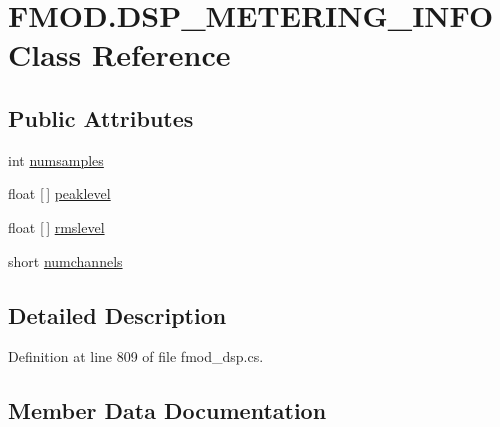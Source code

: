 \hypertarget{class_f_m_o_d_1_1_d_s_p___m_e_t_e_r_i_n_g___i_n_f_o}{}\section{F\+M\+O\+D.\+D\+S\+P\+\_\+\+M\+E\+T\+E\+R\+I\+N\+G\+\_\+\+I\+N\+FO Class Reference}
\label{class_f_m_o_d_1_1_d_s_p___m_e_t_e_r_i_n_g___i_n_f_o}
\subsection*{Public Attributes}
\begin{DoxyCompactItemize}
\item 
int \hyperlink{class_f_m_o_d_1_1_d_s_p___m_e_t_e_r_i_n_g___i_n_f_o_a053ebd13b97ccd7d6b63060e88d7ae6f}{numsamples}
\item 
float \mbox{[}$\,$\mbox{]} \hyperlink{class_f_m_o_d_1_1_d_s_p___m_e_t_e_r_i_n_g___i_n_f_o_ac0153e5a96990406af1755f95d36963e}{peaklevel}
\item 
float \mbox{[}$\,$\mbox{]} \hyperlink{class_f_m_o_d_1_1_d_s_p___m_e_t_e_r_i_n_g___i_n_f_o_a43763cecddf4c882368f5d0ec709fd3b}{rmslevel}
\item 
short \hyperlink{class_f_m_o_d_1_1_d_s_p___m_e_t_e_r_i_n_g___i_n_f_o_a6ff33cbf09acf8870fdaee94e5d45282}{numchannels}
\end{DoxyCompactItemize}


\subsection{Detailed Description}


Definition at line 809 of file fmod\+\_\+dsp.\+cs.



\subsection{Member Data Documentation}
\mbox{\label{class_f_m_o_d_1_1_d_s_p___m_e_t_e_r_i_n_g___i_n_f_o_a6ff33cbf09acf8870fdaee94e5d45282}} 
